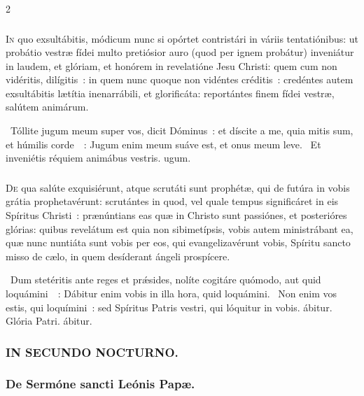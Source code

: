 \documentclass[9pt,twoside]{extarticle}
\begin{document}
\begin{multicols}{2}
{{\subsubsection*{\center {}}
\lettrine{I}n quo exsultábitis, módicum nunc si opórtet contristári in váriis tentatiónibus:
ut probátio vestræ fídei multo pretiósior auro (quod per ignem probátur) inveniátur in laudem, et glóriam, et honórem in revelatióne Jesu Christi:
quem cum non vidéritis, dilígitis~: in quem nunc quoque non vidéntes créditis~: credéntes autem exsultábitis lætítia inenarrábili, et glorificáta:
reportántes finem fídei vestræ, salútem animárum.

\begin{tightlist}{}
\item {}~Tóllite jugum meum super vos, dicit Dóminus~: et díscite a me, quia mitis sum, et húmilis corde~~: \textred{*} Jugum enim meum suáve est, et onus meum leve. ~Et inveniétis réquiem animábus vestris. ugum.
\end{tightlist}

\subsubsection*{\center {}}
\lettrine{D}e qua salúte exquisiérunt, atque scrutáti sunt prophétæ, qui de futúra in vobis grátia prophetavérunt:
scrutántes in quod, vel quale tempus significáret in eis Spíritus Christi~: prænúntians eas quæ in Christo sunt passiónes, et posterióres glórias:
quibus revelátum est quia non sibimetípsis, vobis autem ministrábant ea, quæ nunc nuntiáta sunt vobis per eos, qui evangelizavérunt vobis, Spíritu sancto misso de cælo, in quem desíderant ángeli prospícere.

\begin{tightlist}{}
\item {}~Dum stetéritis ante reges et prǽsides, nolíte cogitáre quómodo, aut quid loquámini~~: \textred{*} Dábitur enim vobis in illa hora, quid loquámini. ~Non enim vos estis, qui loquímini~: sed Spíritus Patris vestri, qui lóquitur in vobis. ábitur. Glória Patri. ábitur.
\end{tightlist}

\subsubsection*{\center \textsc{IN SECUNDO NOCTURNO.}}
\subsubsection*{\center De Sermóne sancti Leónis Papæ.}
}}
\end{multicols}
\end{document}
